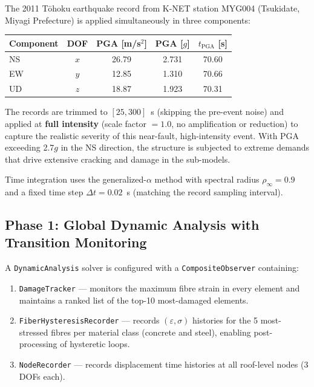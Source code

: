 The 2011 T\=ohoku earthquake record from K-NET station MYG004
(Tsukidate, Miyagi Prefecture) is applied simultaneously in three
components:

\begin{center}
\begin{tabular}{lcccc}
  \toprule
  Component & DOF & PGA [m/s$^2$] & PGA [$g$] & $t_{\mathrm{PGA}}$ [s] \\
  \midrule
  NS & $x$ & 26.79 & 2.731 & 70.60 \\
  EW & $y$ & 12.85 & 1.310 & 70.66 \\
  UD & $z$ & 18.87 & 1.923 & 70.31 \\
  \bottomrule
\end{tabular}
\end{center}

The records are trimmed to $[25, 300]$~s (skipping the pre-event
noise) and applied at \textbf{full intensity} (scale factor $= 1.0$,
no amplification or reduction) to capture the realistic severity of
this near-fault, high-intensity event.  With PGA exceeding 2.7$g$ in
the NS direction, the structure is subjected to extreme demands that
drive extensive cracking and damage in the sub-models.

Time integration uses the generalized-$\alpha$ method with spectral
radius $\rho_\infty = 0.9$ and a fixed time step
$\Delta t = 0.02$~s (matching the record sampling interval).


\subsection{Phase 1: Global Dynamic Analysis with Transition Monitoring}
\label{ssec:nlevo-phase1}

A \texttt{DynamicAnalysis} solver is configured with a
\texttt{CompositeObserver} containing:
\begin{enumerate}
  \item \texttt{DamageTracker} --- monitors the maximum fibre strain
        in every element and maintains a ranked list of the top-10
        most-damaged elements.
  \item \texttt{FiberHysteresisRecorder} --- records
        $(\varepsilon, \sigma)$ histories for the 5 most-stressed
        fibres per material class (concrete and steel), enabling
        post-processing of hysteretic loops.
  \item \texttt{NodeRecorder} --- records displacement time histories
        at all roof-level nodes (3 DOFs each).
\end{enumerate}

